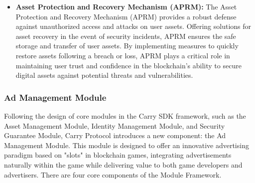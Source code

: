 \begin{itemize}
\item \textbf{Asset Protection and Recovery Mechanism (APRM):} The Asset Protection and Recovery Mechanism (APRM) provides a robust defense against unauthorized access and attacks on user assets. Offering solutions for asset recovery in the event of security incidents, APRM ensures the safe storage and transfer of user assets. By implementing measures to quickly restore assets following a breach or loss, APRM plays a critical role in maintaining user trust and confidence in the blockchain's ability to secure digital assets against potential threats and vulnerabilities.
\end{itemize}

\subsubsection{Ad Management Module}
Following the design of core modules in the Carry SDK framework, such as the Asset Management Module, Identity Management Module, and Security Guarantee Module, Carry Protocol introduces a new component: the Ad Management Module. This module is designed to offer an innovative advertising paradigm based on "slots" in blockchain games, integrating advertisements naturally within the game while delivering value to both game developers and advertisers. There are four core components of the Module Framework.
